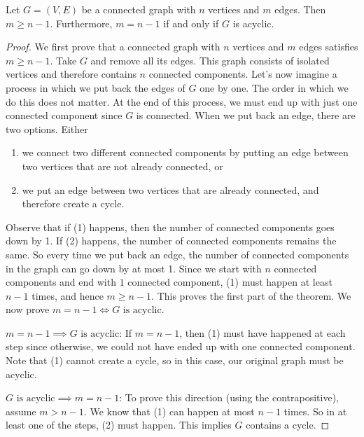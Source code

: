 \begin{flex}
\label{grp:theorem:Min-number-of-edges-to-connect-a-graph}

\begin{theorem}
\label{theorem:Min-number-of-edges-to-connect-a-graph}
Let $G = (V,E)$ be a connected graph with $n$ vertices and $m$ edges. Then $m \geq n-1$. Furthermore, $m = n-1$ if and only if $G$ is acyclic.

\end{theorem}

\begin{proof}
\label{prf:intro-to-graph-theory::prove}
We first prove that a connected graph with $n$ vertices and $m$ edges satisfies $m \geq n-1$. Take $G$ and remove all its edges. This graph consists of isolated vertices and therefore contains $n$ connected components. Let's now imagine a process in which we put back the edges of $G$ one by one. The order in which we do this does not matter. At the end of this process, we must end up with just one connected component since $G$ is connected. When we put back an edge, there are two options. Either 
\begin{enumerate}
    \item we connect two different connected components by putting an edge between two vertices that are not already connected, or
    \item we put an edge between two vertices that are already connected, and therefore create a cycle.
\end{enumerate}
Observe that if (1) happens, then the number of connected components goes down by 1. If (2) happens, the number of connected components remains the same. So every time we put back an edge, the number of connected components in the graph can go down by at most 1. Since we start with $n$ connected components and end with $1$ connected component, (1) must happen at least $n-1$ times, and hence $m \geq n-1$. This proves the first part of the theorem. We now prove $m = n-1 \Longleftrightarrow  \text{$G$ is acyclic}$.

$m = n-1 \implies \text{$G$ is acyclic}$: If $m = n-1$, then (1) must have happened at each step since otherwise, we could not have ended up with one connected component. Note that (1) cannot create a cycle, so in this case, our original graph must be acyclic. 

$\text{$G$ is acyclic} \implies m = n-1$: To prove this direction (using the contrapositive), assume $m > n-1$. We know that (1) can happen at most $n-1$ times. So in at least one of the steps, (2) must happen. This implies $G$ contains a cycle.

\end{proof}
\end{flex}

